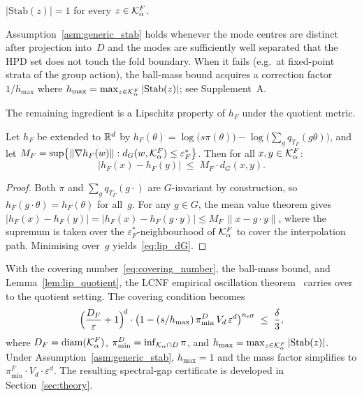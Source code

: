 \begin{assumption}\label{asm:generic_stab}
  $|\mathrm{Stab}(z)| = 1$ for every $z \in \mathcal{K}_\alpha^F$.
\end{assumption}

\noindent
Assumption~\ref{asm:generic_stab} holds whenever the mode centres are
distinct after projection into~$D$ and the modes are sufficiently
well separated that the HPD set does not touch the fold boundary.
When it fails (e.g.\ at fixed-point strata of the group action),
the ball-mass bound acquires a correction factor
$1/h_{\max}$ where
$h_{\max} = \max_{z \in \mathcal{K}_\alpha^F} |\mathrm{Stab}(z)|$;
see Supplement~A.

The remaining ingredient is a Lipschitz property of $h_F$ under
the quotient metric.

\begin{lemma}\label{lem:lip_quotient}
  Let $h_F$ be extended to $\mathbb{R}^d$ by
  $h_F(\theta) = \log\bigl(s\pi(\theta)\bigr)
  - \log\bigl(\sum_g q_{T_F}(g\theta)\bigr)$,
  and let
  $M_F = \sup\bigl\{\|\nabla h_F(w)\| :
  d_G(w, \mathcal{K}_\alpha^F) \leq \varepsilon_F^*\bigr\}$.
  Then for all $x, y \in \mathcal{K}_\alpha^F$:
  \begin{equation}\label{eq:lip_dG}
    |h_F(x) - h_F(y)| \;\leq\; M_F \cdot d_G(x, y).
  \end{equation}
\end{lemma}

\begin{proof}
  Both $\pi$ and $\sum_g q_{T_F}(g \cdot {})$ are $G$-invariant by
  construction, so $h_F(g \cdot \theta) = h_F(\theta)$ for all~$g$.
  For any $g \in G$, the mean value theorem gives
  $|h_F(x) - h_F(y)| = |h_F(x) - h_F(g \cdot y)|
  \leq M_F\,\|x - g \cdot y\|$,
  where the supremum is taken over the $\varepsilon_F^*$-neighbourhood
  of $\mathcal{K}_\alpha^F$ to cover the interpolation path.
  Minimising over~$g$ yields~\eqref{eq:lip_dG}.
\end{proof}

\noindent
With the covering number~\eqref{eq:covering_number}, the ball-mass
bound, and Lemma~\ref{lem:lip_quotient}, the LCNF empirical
oscillation theorem~\citep[Theorem~5.1]{LCNF} carries over to the
quotient setting.  The covering condition becomes
\begin{equation}\label{eq:covering_cond_F}
  \Bigl(\frac{D_F}{\varepsilon} + 1\Bigr)^{\!d}
  \cdot
  \bigl(1 - (s/h_{\max})\,\pi_{\min}^D\, V_d\, \varepsilon^d\bigr)^{n_{\mathrm{eff}}}
  \;\leq\; \frac{\delta}{3},
\end{equation}
where $D_F = \mathrm{diam}(\mathcal{K}_\alpha^F)$,
$\pi_{\min}^D = \inf_{\mathcal{K}_\alpha \cap D}\pi$, and
$h_{\max} = \max_{z \in \mathcal{K}_\alpha^F}|\mathrm{Stab}(z)|$.
Under Assumption~\ref{asm:generic_stab}, $h_{\max} = 1$ and the
mass factor simplifies to $\pi_{\min}^F \cdot V_d \cdot \varepsilon^d$.
The resulting spectral-gap certificate is developed in
Section~\ref{sec:theory}.


